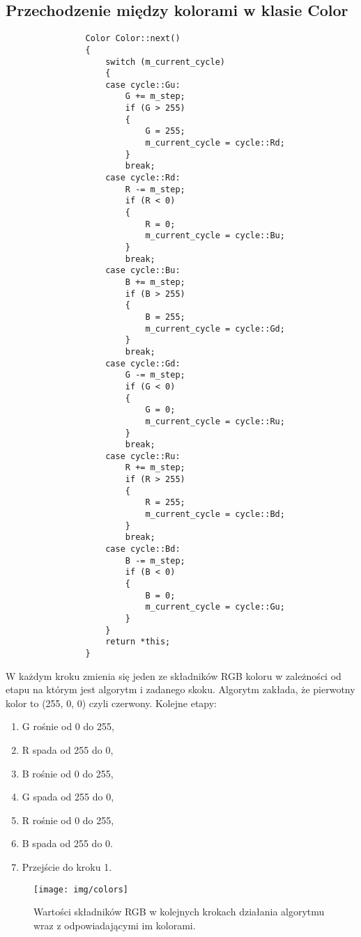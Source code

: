 		\subsection{Przechodzenie między kolorami w klasie Color}
			\begin{lstlisting}
				Color Color::next()
				{
					switch (m_current_cycle)
					{
					case cycle::Gu:
						G += m_step;
						if (G > 255)
						{
							G = 255;
							m_current_cycle = cycle::Rd;
						}
						break;
					case cycle::Rd:
						R -= m_step;
						if (R < 0)
						{
							R = 0;
							m_current_cycle = cycle::Bu;
						}
						break;
					case cycle::Bu:
						B += m_step;
						if (B > 255)
						{
							B = 255;
							m_current_cycle = cycle::Gd;
						}
						break;
					case cycle::Gd:
						G -= m_step;
						if (G < 0)
						{
							G = 0;
							m_current_cycle = cycle::Ru;
						}
						break;
					case cycle::Ru:
						R += m_step;
						if (R > 255)
						{
							R = 255;
							m_current_cycle = cycle::Bd;
						}
						break;
					case cycle::Bd:
						B -= m_step;
						if (B < 0)
						{
							B = 0;
							m_current_cycle = cycle::Gu;
						}
					}
					return *this;
				}
			\end{lstlisting}
			\pagebreak
			W każdym kroku zmienia się jeden ze składników RGB koloru w zależności od etapu na którym jest algorytm i zadanego skoku.
			Algorytm zakłada, że pierwotny kolor to (255, 0, 0) czyli czerwony. Kolejne etapy:
			\begin{enumerate}
				\item G rośnie od 0 do 255,
				\item R spada od 255 do 0,
				\item B rośnie od 0 do 255,
				\item G spada od 255 do 0,
				\item R rośnie od 0 do 255,
				\item B spada od 255 do 0.
				\item Przejście do kroku 1.
			\end{enumerate}
			\begin{figure}[h!]
				\centering
				\texttt{[image: img/colors]}
				\caption{Wartości składników RGB w kolejnych krokach działania algorytmu wraz z odpowiadającymi im kolorami.}
			\end{figure}
